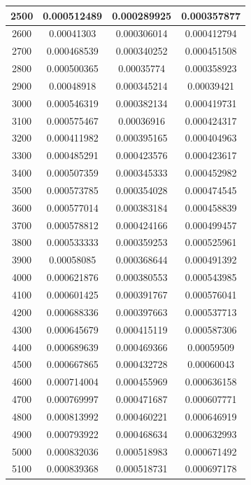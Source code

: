 \documentclass[11pt,spanish]{article} %
\begin{document}
\begin{center}
\begin{longtable}{|c|c|c|c|}
2500 & 0.000512489 & 0.000289925 & 0.000357877 \\ \hline
2600 & 0.00041303  & 0.000306014 & 0.000412794 \\ \hline
2700 & 0.000468539 & 0.000340252 & 0.000451508 \\ \hline
2800 & 0.000500365 & 0.00035774  & 0.000358923 \\ \hline
2900 & 0.00048918  & 0.000345214 & 0.00039421  \\ \hline
3000 & 0.000546319 & 0.000382134 & 0.000419731 \\ \hline
3100 & 0.000575467 & 0.00036916  & 0.000424317 \\ \hline
3200 & 0.000411982 & 0.000395165 & 0.000404963 \\ \hline
3300 & 0.000485291 & 0.000423576 & 0.000423617 \\ \hline
3400 & 0.000507359 & 0.000345333 & 0.000452982 \\ \hline
3500 & 0.000573785 & 0.000354028 & 0.000474545 \\ \hline
3600 & 0.000577014 & 0.000383184 & 0.000458839 \\ \hline
3700 & 0.000578812 & 0.000424166 & 0.000499457 \\ \hline
3800 & 0.000533333 & 0.000359253 & 0.000525961 \\ \hline
3900 & 0.00058085  & 0.000368644 & 0.000491392 \\ \hline
4000 & 0.000621876 & 0.000380553 & 0.000543985 \\ \hline
4100 & 0.000601425 & 0.000391767 & 0.000576041 \\ \hline
4200 & 0.000688336 & 0.000397663 & 0.000537713 \\ \hline
4300 & 0.000645679 & 0.000415119 & 0.000587306 \\ \hline
4400 & 0.000689639 & 0.000469366 & 0.00059509  \\ \hline
4500 & 0.000667865 & 0.000432728 & 0.00060043  \\ \hline
4600 & 0.000714004 & 0.000455969 & 0.000636158 \\ \hline
4700 & 0.000769997 & 0.000471687 & 0.000607771 \\ \hline
4800 & 0.000813992 & 0.000460221 & 0.000646919 \\ \hline
4900 & 0.000793922 & 0.000468634 & 0.000632993 \\ \hline
5000 & 0.000832036 & 0.000518983 & 0.000671492 \\ \hline
5100 & 0.000839368 & 0.000518731 & 0.000697178 \\ \hline

\end{longtable}
\end{center}
\end{document}

